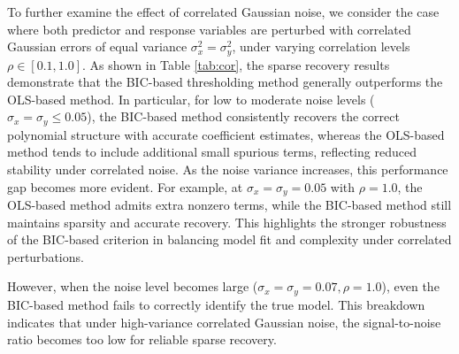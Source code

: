 To further examine the effect of correlated Gaussian noise, we consider the case where both predictor and response variables are perturbed with correlated Gaussian errors of equal variance $\sigma_x^2 = \sigma_y^2$, under varying correlation levels $\rho \in [0.1, 1.0]$. As shown in Table \ref{tab:cor}, the sparse recovery results demonstrate that the BIC-based thresholding method generally outperforms the OLS-based method. In particular, for low to moderate noise levels ($\sigma_x = \sigma_y \leq 0.05$), the BIC-based method consistently recovers the correct polynomial structure with accurate coefficient estimates, whereas the OLS-based method tends to include additional small spurious terms, reflecting reduced stability under correlated noise.
As the noise variance increases, this performance gap becomes more evident. For example, at $\sigma_x = \sigma_y = 0.05$ with $\rho=1.0$, the OLS-based method admits extra nonzero terms, while the BIC-based method still maintains sparsity and accurate recovery. This highlights the stronger robustness of the BIC-based criterion in balancing model fit and complexity under correlated perturbations.

However, when the noise level becomes large ($\sigma_x = \sigma_y = 0.07, \rho=1.0$), even the BIC-based method fails to correctly identify the true model. This breakdown indicates that under high-variance correlated Gaussian noise, the signal-to-noise ratio becomes too low for reliable sparse recovery.

